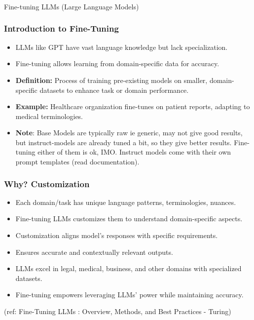\begin{frame}[fragile]\frametitle{}
\begin{center}
{\Large Fine-tuning LLMs (Large Language Models)}
\end{center}
\end{frame}

\begin{frame}[fragile]\frametitle{Introduction to Fine-Tuning}
  \begin{itemize}
      \item LLMs like GPT have vast language knowledge but lack specialization.
    \item Fine-tuning allows learning from domain-specific data for accuracy.
    \item \textbf{Definition:} Process of training pre-existing models on smaller, domain-specific datasets to enhance task or domain performance.

    \item \textbf{Example:} Healthcare organization fine-tunes on patient reports, adapting to medical terminologies.
	

	
	\item \textbf{Note}: Base Models are typically raw ie generic, may not give good results, but instruct-models are already tuned a bit, so they give better results. Fine-tuning either of them is ok, IMO. Instruct models come with their own prompt templates (read documentation).

  \end{itemize}
\end{frame}

\begin{frame}[fragile]\frametitle{Why? Customization}
  \begin{itemize}
    \item Each domain/task has unique language patterns, terminologies, nuances.
    \item Fine-tuning LLMs customizes them to understand domain-specific aspects.
    \item Customization aligns model's responses with specific requirements.
    \item Ensures accurate and contextually relevant outputs.
    \item LLMs excel in legal, medical, business, and other domains with specialized datasets.
    \item Fine-tuning empowers leveraging LLMs' power while maintaining accuracy.
  \end{itemize}
  
  {\tiny (ref: Fine-Tuning LLMs : Overview, Methods, and Best Practices - Turing)}
  
\end{frame}

